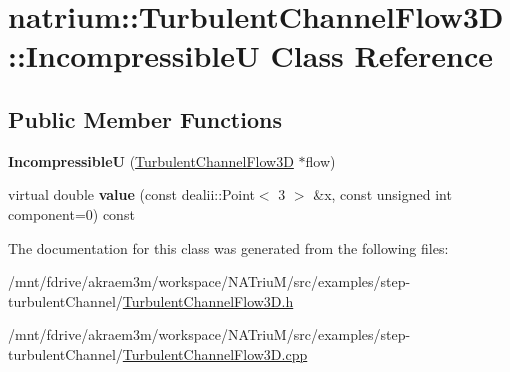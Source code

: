\hypertarget{classnatrium_1_1TurbulentChannelFlow3D_1_1IncompressibleU}{
\section{natrium::TurbulentChannelFlow3D::IncompressibleU Class Reference}
\label{classnatrium_1_1TurbulentChannelFlow3D_1_1IncompressibleU}
}
\subsection*{Public Member Functions}
\begin{DoxyCompactItemize}
\item 
\hypertarget{classnatrium_1_1TurbulentChannelFlow3D_1_1IncompressibleU_a01de7f0e7a79f00ce396b1d49aca1fd1}{
{\bfseries IncompressibleU} (\hyperlink{classnatrium_1_1TurbulentChannelFlow3D}{TurbulentChannelFlow3D} $\ast$flow)}
\label{classnatrium_1_1TurbulentChannelFlow3D_1_1IncompressibleU_a01de7f0e7a79f00ce396b1d49aca1fd1}

\item 
\hypertarget{classnatrium_1_1TurbulentChannelFlow3D_1_1IncompressibleU_adc3f9d465f50012821884e68abc93d88}{
virtual double {\bfseries value} (const dealii::Point$<$ 3 $>$ \&x, const unsigned int component=0) const }
\label{classnatrium_1_1TurbulentChannelFlow3D_1_1IncompressibleU_adc3f9d465f50012821884e68abc93d88}

\end{DoxyCompactItemize}


The documentation for this class was generated from the following files:\begin{DoxyCompactItemize}
\item 
/mnt/fdrive/akraem3m/workspace/NATriuM/src/examples/step-\/turbulentChannel/\hyperlink{TurbulentChannelFlow3D_8h}{TurbulentChannelFlow3D.h}\item 
/mnt/fdrive/akraem3m/workspace/NATriuM/src/examples/step-\/turbulentChannel/\hyperlink{TurbulentChannelFlow3D_8cpp}{TurbulentChannelFlow3D.cpp}\end{DoxyCompactItemize}

